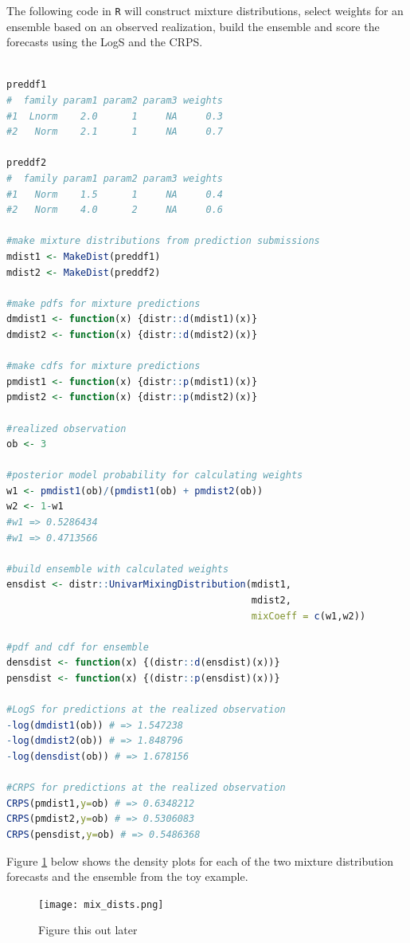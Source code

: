 \documentclass{article}\usepackage[]{graphicx}\usepackage[]{color}
\begin{document}
The following code in \texttt{R} will construct mixture distributions, select
weights for an ensemble based on an observed realization, build the ensemble and 
score the forecasts using the
LogS and the CRPS.

\newpage
\begin{lstlisting}[language=R]

preddf1
#  family param1 param2 param3 weights
#1  Lnorm    2.0      1     NA     0.3
#2   Norm    2.1      1     NA     0.7

preddf2
#  family param1 param2 param3 weights
#1   Norm    1.5      1     NA     0.4
#2   Norm    4.0      2     NA     0.6

#make mixture distributions from prediction submissions
mdist1 <- MakeDist(preddf1)
mdist2 <- MakeDist(preddf2)

#make pdfs for mixture predictions
dmdist1 <- function(x) {distr::d(mdist1)(x)}
dmdist2 <- function(x) {distr::d(mdist2)(x)}

#make cdfs for mixture predictions
pmdist1 <- function(x) {distr::p(mdist1)(x)}
pmdist2 <- function(x) {distr::p(mdist2)(x)}

#realized observation
ob <- 3

#posterior model probability for calculating weights
w1 <- pmdist1(ob)/(pmdist1(ob) + pmdist2(ob))
w2 <- 1-w1
#w1 => 0.5286434
#w1 => 0.4713566

#build ensemble with calculated weights
ensdist <- distr::UnivarMixingDistribution(mdist1,
                                           mdist2,
                                           mixCoeff = c(w1,w2))

#pdf and cdf for ensemble
densdist <- function(x) {(distr::d(ensdist)(x))}
pensdist <- function(x) {(distr::p(ensdist)(x))}

#LogS for predictions at the realized observation
-log(dmdist1(ob)) # => 1.547238
-log(dmdist2(ob)) # => 1.848796
-log(densdist(ob)) # => 1.678156

#CRPS for predictions at the realized observation
CRPS(pmdist1,y=ob) # => 0.6348212
CRPS(pmdist2,y=ob) # => 0.5306083
CRPS(pensdist,y=ob) # => 0.5486368
\end{lstlisting}


Figure \ref{figmixs} below shows the density plots for each of the two mixture
distribution forecasts and the ensemble from the toy example. 


\begin{figure}[htbp]
\centerline{\texttt{[image: mix\_dists.png]}}
\caption{Figure this out later}
\label{figmixs}
\end{figure}
\end{document}

